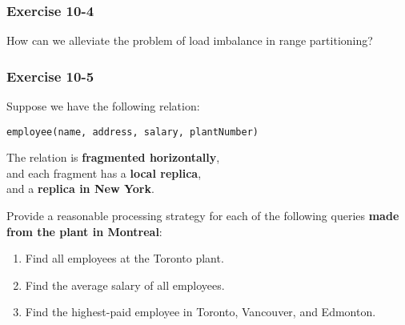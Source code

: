 \begin{frame}
\frametitle{Exercise 10-4}

How can we alleviate the problem of load imbalance in range partitioning?

\end{frame}


\begin{frame}
\frametitle{Exercise 10-5}

Suppose we have the following relation: \\
\begin{center}
  \texttt{employee(name, address, salary, plantNumber)}
\end{center}

The relation is \textbf{fragmented horizontally}, \\
and each fragment has a \textbf{local replica}, \\
and a \textbf{replica in New York}.

Provide a reasonable processing strategy for each of the following queries \textbf{made from the plant in Montreal}:

\begin{enumerate}
  \item Find all employees at the Toronto plant.
  \item Find the average salary of all employees.
  \item Find the highest-paid employee in Toronto, Vancouver, and Edmonton.
\end{enumerate}

\end{frame}


